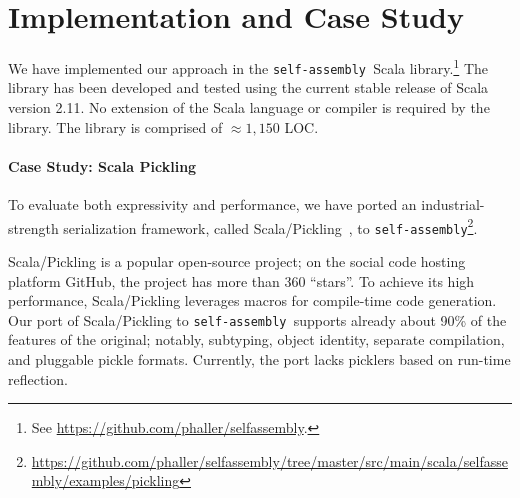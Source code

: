 \documentclass[preprint,nocopyrightspace]{sigplanconf}
\newcommand{\selfassembly}{\texttt{self-assembly~}}
\newcommand{\sselfassembly}{\texttt{self-assembly}}
\begin{document}
\section{Implementation and Case Study}

We have implemented our approach in the \selfassembly Scala
library.\footnote{See \url{https://github.com/phaller/selfassembly}.} The
library has been developed and tested using the current stable release of
Scala version 2.11. No extension of the Scala language or compiler is required
by the library. The library is comprised of $\approx1,150$ LOC.



\paragraph{Case Study: Scala Pickling}

To evaluate both expressivity and performance, we have ported an industrial-
strength serialization framework, called Scala/Pickling~\cite{Pickling}, to
\sselfassembly\footnote{\url{https://github.com/phaller/selfassembly/tree/master/src/main/scala/selfassembly/examples/pickling}}.

Scala/Pickling is a popular open-source project; on the social code
hosting platform GitHub, the project has more than 360 ``stars''.
To achieve its high performance, Scala/Pickling leverages macros for compile-time code
generation. Our port of Scala/Pickling to \selfassembly supports
already about 90\% of the features of the original; notably, subtyping, object
identity, separate compilation, and pluggable pickle formats. Currently, the
port lacks picklers based on run-time reflection.
\end{document}
